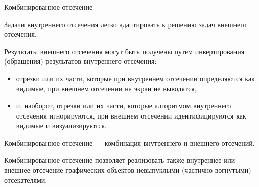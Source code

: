 \documentclass{beamer}
\begin{document}
	\begin{frame}{Комбинированное отсечение}

		Задачи внутреннего отсечения легко адаптировать к решению задач внешнего отсечения.
		
		
		Результаты внешнего отсечения могут быть получены путем инвертирования (обращения) результатов внутреннего отсечения:
		\begin{itemize}
			\item 
			отрезки или их части, которые при внутреннем отсечении определяются как видимые, при внешнем отсечении на экран не выводятся, 
			\item 
			и, наоборот, отрезки или их части, которые алгоритмом внутреннего отсечения игнорируются, при внешнем отсечении идентифицируются как видимые и визуализируются. 
		\end{itemize}
		
		Комбинированное отсечение --- комбинация внутреннего и внешнего отсечений.

		
		Комбинированное отсечение позволяет реализовать также внутреннее или внешнее отсечение графических объектов невыпуклыми (частично вогнутыми) отсекателями.
		


	\end{frame}

	
\end{document}
